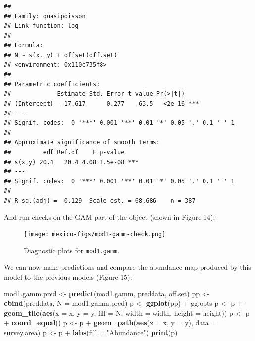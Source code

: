 \documentclass[]{amsart}
\newenvironment{Shaded}{}{}
\newcommand{\KeywordTok}[1]{\textcolor[rgb]{0.00,0.44,0.13}{\textbf{{#1}}}}
\newcommand{\DataTypeTok}[1]{\textcolor[rgb]{0.56,0.13,0.00}{{#1}}}
\newcommand{\StringTok}[1]{\textcolor[rgb]{0.25,0.44,0.63}{{#1}}}
\newcommand{\NormalTok}[1]{{#1}}
\begin{document}
\begin{Shaded}
\end{Shaded}

\begin{verbatim}
## 
## Family: quasipoisson 
## Link function: log 
## 
## Formula:
## N ~ s(x, y) + offset(off.set)
## <environment: 0x110c735f8>
## 
## Parametric coefficients:
##             Estimate Std. Error t value Pr(>|t|)    
## (Intercept)  -17.617      0.277   -63.5   <2e-16 ***
## ---
## Signif. codes:  0 '***' 0.001 '**' 0.01 '*' 0.05 '.' 0.1 ' ' 1
## 
## Approximate significance of smooth terms:
##         edf Ref.df    F p-value    
## s(x,y) 20.4   20.4 4.08 1.5e-08 ***
## ---
## Signif. codes:  0 '***' 0.001 '**' 0.01 '*' 0.05 '.' 0.1 ' ' 1
## 
## R-sq.(adj) =  0.129  Scale est. = 68.686    n = 387
\end{verbatim}

And run checks on the GAM part of the object (shown in Figure 14):

\begin{Shaded}
\end{Shaded}

\begin{figure}[htbp]
\centering
\texttt{[image: mexico-figs/mod1-gamm-check.png]}
\caption{Diagnostic plots for \texttt{mod1.gamm}.}
\end{figure}

We can now make predictions and compare the abundance map produced by
this model to the previous models (Figure 15):

\begin{Shaded}
\begin{Highlighting}[]
\NormalTok{mod1.gamm.pred <-}\StringTok{ }\KeywordTok{predict}\NormalTok{(mod1.gamm, preddata, off.set)}
\NormalTok{pp <-}\StringTok{ }\KeywordTok{cbind}\NormalTok{(preddata, }\DataTypeTok{N =} \NormalTok{mod1.gamm.pred)}
\NormalTok{p <-}\StringTok{ }\KeywordTok{ggplot}\NormalTok{(pp) +}\StringTok{ }\NormalTok{gg.opts}
\NormalTok{p <-}\StringTok{ }\NormalTok{p +}\StringTok{ }\KeywordTok{geom_tile}\NormalTok{(}\KeywordTok{aes}\NormalTok{(}\DataTypeTok{x =} \NormalTok{x, }\DataTypeTok{y =} \NormalTok{y, }\DataTypeTok{fill =} \NormalTok{N, }\DataTypeTok{width =} \NormalTok{width, }\DataTypeTok{height =} \NormalTok{height))}
\NormalTok{p <-}\StringTok{ }\NormalTok{p +}\StringTok{ }\KeywordTok{coord_equal}\NormalTok{()}
\NormalTok{p <-}\StringTok{ }\NormalTok{p +}\StringTok{ }\KeywordTok{geom_path}\NormalTok{(}\KeywordTok{aes}\NormalTok{(}\DataTypeTok{x =} \NormalTok{x, }\DataTypeTok{y =} \NormalTok{y), }\DataTypeTok{data =} \NormalTok{survey.area)}
\NormalTok{p <-}\StringTok{ }\NormalTok{p +}\StringTok{ }\KeywordTok{labs}\NormalTok{(}\DataTypeTok{fill =} \StringTok{"Abundance"}\NormalTok{)}
\KeywordTok{print}\NormalTok{(p)}
\end{Highlighting}
\end{Shaded}
\end{document}
